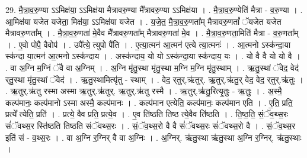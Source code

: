 \documentclass[17pt]{extarticle}
\begin{document}
29. मै॒त्रा॒व॒रु॒ण्या ऽऽमिक्ष॑या॒ ऽऽमिक्ष॑या मैत्रावरु॒ण्या मै᳚त्रावरु॒ण्या ऽऽमिक्ष॑या । . मै॒त्रा॒व॒रु॒ण्येति॑ मैत्रा - व॒रु॒ण्या । . आ॒मिक्ष॑या यजेत यजेता॒ मिक्ष॑या॒ ऽऽमिक्ष॑या यजेत । . य॒जे॒त॒ मै॒त्रा॒व॒रु॒णता᳚म् मैत्रावरु॒णतां᳚ ॅयजेत यजेत मैत्रावरु॒णता᳚म् । . मै॒त्रा॒व॒रु॒णता॑ मे॒वैव मै᳚त्रावरु॒णता᳚म् मैत्रावरु॒णता॑ मे॒व । . मै॒त्रा॒व॒रु॒णता॒मिति॑ मैत्रा - व॒रु॒णता᳚म् । . ए॒वो पोपै॒ वैवोप॑ । . उपै᳚त्ये॒ त्युपो पै॑ति । . ए॒त्या॒त्मन॑ आ॒त्मन॑ एत्ये त्या॒त्मनः॑ । . आ॒त्मनो ऽस्क॑न्दा॒या स्क॑न्दा या॒त्मन॑ आ॒त्मनो ऽस्क॑न्दाय । . अस्क॑न्दाय॒ यो यो ऽस्क॑न्दा॒या स्क॑न्दाय॒ यः । . यो वै वै यो यो वै । . वा अ॒ग्नि म॒ग्निं ॅवै वा अ॒ग्निम् । . अ॒ग्नि मृ॑तु॒स्था मृ॑तु॒स्था म॒ग्नि म॒ग्नि मृ॑तु॒स्थाम् । . ऋ॒तु॒स्थां ॅवेद॒ वेद॑ र्‌तु॒स्था मृ॑तु॒स्थां ॅवेद॑ । . ऋ॒तु॒स्थामित्यृ॑तु - स्थाम् । . वेद॒ र्‌तुर्.ऋ॑तुर्. ऋ॒तुर्.ऋ॑तु॒र् वेद॒ वेद॒ र्‌तुर्.ऋ॑तुः । . ऋ॒तुर्.ऋ॑तु रस्मा अस्मा ऋ॒तुर्.ऋ॑तुर्. ऋ॒तुर्.ऋ॑तु रस्मै । . ऋ॒तुर्.ऋ॑तु॒रित्यृ॒तुः - ऋ॒तुः॒ । . अ॒स्मै॒ कल्प॑मानः॒ कल्प॑मानो ऽस्मा अस्मै॒ कल्प॑मानः । . कल्प॑मान एत्येति॒ कल्प॑मानः॒ कल्प॑मान एति । . ए॒ति॒ प्रति॒ प्रत्ये᳚ त्येति॒ प्रति॑ । . प्रत्ये॒ वैव प्रति॒ प्रत्ये॒व । . ए॒व ति॑ष्ठति तिष्ठ त्ये॒वैव ति॑ष्ठति । . ति॒ष्ठ॒ति॒ सं॒ॅव॒थ्स॒रः सं॑ॅवथ्स॒र स्ति॑ष्ठति तिष्ठति संॅवथ्स॒रः । . सं॒ॅव॒थ्स॒रो वै वै सं॑ॅवथ्स॒रः सं॑ॅवथ्स॒रो वै । . सं॒ॅव॒थ्स॒र इति॑ सं - व॒थ्स॒रः । . वा अ॒ग्नि र॒ग्निर् वै वा अ॒ग्निः । . अ॒ग्निर्. ऋ॑तु॒स्था ऋ॑तु॒स्था अ॒ग्नि र॒ग्निर्. ऋ॑तु॒स्थाः । \newline
\end{document}
